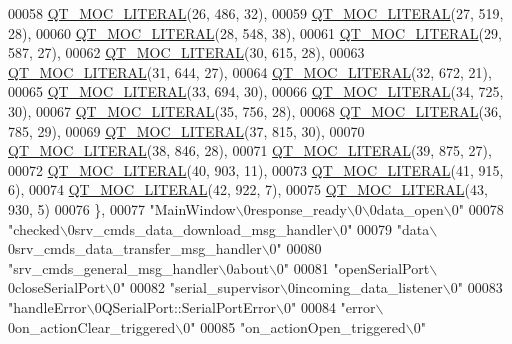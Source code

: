 \begin{DoxyCode}
00058 \hyperlink{a00015_a75bb9482d242cde0a06c9dbdc6b83abe}{QT\_MOC\_LITERAL}(26, 486, 32),
00059 \hyperlink{a00015_a75bb9482d242cde0a06c9dbdc6b83abe}{QT\_MOC\_LITERAL}(27, 519, 28),
00060 \hyperlink{a00015_a75bb9482d242cde0a06c9dbdc6b83abe}{QT\_MOC\_LITERAL}(28, 548, 38),
00061 \hyperlink{a00015_a75bb9482d242cde0a06c9dbdc6b83abe}{QT\_MOC\_LITERAL}(29, 587, 27),
00062 \hyperlink{a00015_a75bb9482d242cde0a06c9dbdc6b83abe}{QT\_MOC\_LITERAL}(30, 615, 28),
00063 \hyperlink{a00015_a75bb9482d242cde0a06c9dbdc6b83abe}{QT\_MOC\_LITERAL}(31, 644, 27),
00064 \hyperlink{a00015_a75bb9482d242cde0a06c9dbdc6b83abe}{QT\_MOC\_LITERAL}(32, 672, 21),
00065 \hyperlink{a00015_a75bb9482d242cde0a06c9dbdc6b83abe}{QT\_MOC\_LITERAL}(33, 694, 30),
00066 \hyperlink{a00015_a75bb9482d242cde0a06c9dbdc6b83abe}{QT\_MOC\_LITERAL}(34, 725, 30),
00067 \hyperlink{a00015_a75bb9482d242cde0a06c9dbdc6b83abe}{QT\_MOC\_LITERAL}(35, 756, 28),
00068 \hyperlink{a00015_a75bb9482d242cde0a06c9dbdc6b83abe}{QT\_MOC\_LITERAL}(36, 785, 29),
00069 \hyperlink{a00015_a75bb9482d242cde0a06c9dbdc6b83abe}{QT\_MOC\_LITERAL}(37, 815, 30),
00070 \hyperlink{a00015_a75bb9482d242cde0a06c9dbdc6b83abe}{QT\_MOC\_LITERAL}(38, 846, 28),
00071 \hyperlink{a00015_a75bb9482d242cde0a06c9dbdc6b83abe}{QT\_MOC\_LITERAL}(39, 875, 27),
00072 \hyperlink{a00015_a75bb9482d242cde0a06c9dbdc6b83abe}{QT\_MOC\_LITERAL}(40, 903, 11),
00073 \hyperlink{a00015_a75bb9482d242cde0a06c9dbdc6b83abe}{QT\_MOC\_LITERAL}(41, 915, 6),
00074 \hyperlink{a00015_a75bb9482d242cde0a06c9dbdc6b83abe}{QT\_MOC\_LITERAL}(42, 922, 7),
00075 \hyperlink{a00015_a75bb9482d242cde0a06c9dbdc6b83abe}{QT\_MOC\_LITERAL}(43, 930, 5)
00076     \},
00077     \textcolor{stringliteral}{"MainWindow\(\backslash\)0response\_ready\(\backslash\)0\(\backslash\)0data\_open\(\backslash\)0"}
00078     \textcolor{stringliteral}{"checked\(\backslash\)0srv\_cmds\_data\_download\_msg\_handler\(\backslash\)0"}
00079     \textcolor{stringliteral}{"data\(\backslash\)0srv\_cmds\_data\_transfer\_msg\_handler\(\backslash\)0"}
00080     \textcolor{stringliteral}{"srv\_cmds\_general\_msg\_handler\(\backslash\)0about\(\backslash\)0"}
00081     \textcolor{stringliteral}{"openSerialPort\(\backslash\)0closeSerialPort\(\backslash\)0"}
00082     \textcolor{stringliteral}{"serial\_supervisor\(\backslash\)0incoming\_data\_listener\(\backslash\)0"}
00083     \textcolor{stringliteral}{"handleError\(\backslash\)0QSerialPort::SerialPortError\(\backslash\)0"}
00084     \textcolor{stringliteral}{"error\(\backslash\)0on\_actionClear\_triggered\(\backslash\)0"}
00085     \textcolor{stringliteral}{"on\_actionOpen\_triggered\(\backslash\)0"}

\end{DoxyCode}
